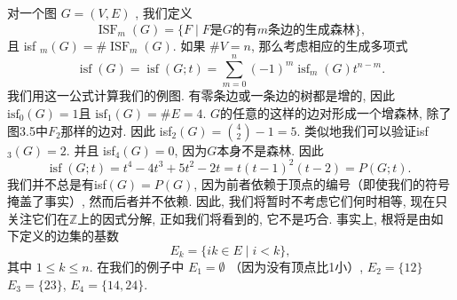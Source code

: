 \documentclass[a4paper,12pt]{ctexbook}
\begin{document}
对一个图 $G=(V, E)$ , 我们定义
$$\operatorname{ISF}_{m}(G)=\{F \mid F\text{是} G\text{的有}m\text{条边的生成森林} \},$$且  isf $_{m}(G)=\# \operatorname{ISF}_{m}(G)$. 如果 $\# V=n$, 那么考虑相应的生成多项式
$$
\operatorname{isf}(G)=\operatorname{isf}(G ; t)=\sum_{m=0}^{n}(-1)^{m} \operatorname{isf}_{m}(G) t^{n-m} .
$$
我们用这一公式计算我们的例图. 有零条边或一条边的树都是增的, 因此$\text{isf}_{0}(G)=1$且  $\text{isf}_{1}(G)=\# E=4$. $G$的任意的这样的边对形成一个增森林, 除了图3.5中$F_{2}$那样的边对. 因此 isf$_{2}(G)=\binom{4}{2}-1=5$.  类似地我们可以验证isf$_{3}(G)=2$. 并且 isf$_{4}(G)=0$, 因为$G$本身不是森林. 因此
$$
\operatorname{isf}(G ; t)=t^{4}-4 t^{3}+5 t^{2}-2 t=t(t-1)^{2}(t-2)=P(G ; t) \text {. }
$$
我们并不总是有isf$(G)=P(G)$, 因为前者依赖于顶点的编号（即使我们的符号掩盖了事实）, 然而后者并不依赖. 因此, 我们将暂时不考虑它们何时相等, 现在只关注它们在$\mathbb{Z}$上的因式分解, 正如我们将看到的, 它不是巧合. 事实上, 根将是由如下定义的边集的基数
\[
E_{k}=\{i k \in E \mid i<k\},\tag{3.12}
\]
其中 $1 \leq k \leq n$. 在我们的例子中 $E_{1}=\emptyset$ （因为没有顶点比1小）, $E_{2}=\{12\}$ $E_{3}=\{23\}$,  $E_{4}=\{14,24\}$.
\end{document}
